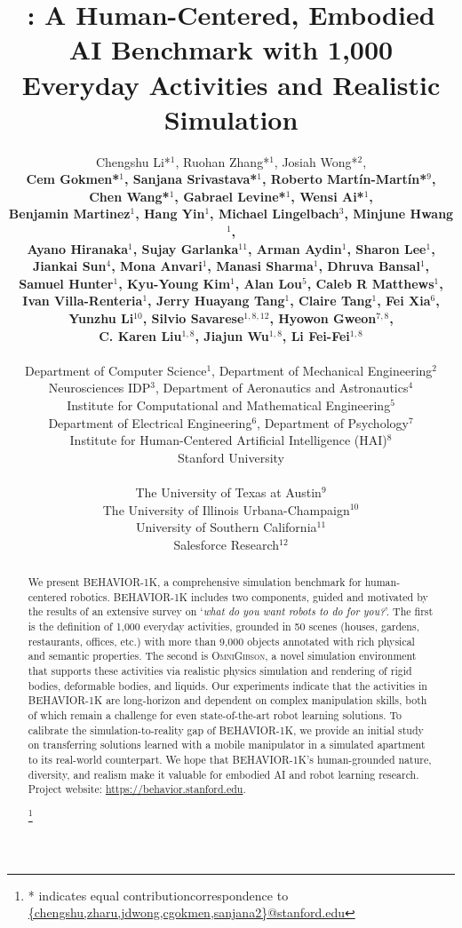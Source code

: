\documentclass{article}
\title{\benchmark: A Human-Centered, Embodied AI Benchmark with 1,000 Everyday Activities and Realistic Simulation}
\author{%
Chengshu Li*$^{\scriptscriptstyle 1}$,
Ruohan Zhang*$^{\scriptscriptstyle 1}$,
Josiah Wong*$^{\scriptscriptstyle 2}$,
\\\textbf{
Cem Gokmen*$^{\scriptscriptstyle 1}$,
Sanjana Srivastava*$^{\scriptscriptstyle 1}$,
Roberto Martín-Martín*$^{\scriptscriptstyle 9}$,
}
\\\textbf{
Chen Wang*$^{\scriptscriptstyle 1}$,
Gabrael Levine*$^{\scriptscriptstyle 1}$,
Wensi Ai*$^{\scriptscriptstyle 1}$,
}
\\\textbf{
Benjamin Martinez$^{\scriptscriptstyle 1}$,
Hang Yin$^{\scriptscriptstyle 1}$,
Michael Lingelbach$^{\scriptscriptstyle 3}$,
Minjune Hwang$^{\scriptscriptstyle 1}$,
}
\\\textbf{
Ayano Hiranaka$^{\scriptscriptstyle 1}$,
Sujay Garlanka$^{\scriptscriptstyle 11}$,
Arman Aydin$^{\scriptscriptstyle 1}$,
Sharon Lee$^{\scriptscriptstyle 1}$,
}
\\\textbf{
Jiankai Sun$^{\scriptscriptstyle 4}$, 
Mona Anvari$^{\scriptscriptstyle 1}$,
Manasi Sharma$^{\scriptscriptstyle 1}$,
Dhruva Bansal$^{\scriptscriptstyle 1}$,
}
\\\textbf{
Samuel Hunter$^{\scriptscriptstyle 1}$,
Kyu-Young Kim$^{\scriptscriptstyle 1}$,
Alan Lou$^{\scriptscriptstyle 5}$,
Caleb R Matthews$^{\scriptscriptstyle 1}$,
}
\\\textbf{
Ivan Villa-Renteria$^{\scriptscriptstyle 1}$, 
Jerry Huayang Tang$^{\scriptscriptstyle 1}$,
Claire Tang$^{\scriptscriptstyle 1}$,
Fei Xia$^{\scriptscriptstyle 6}$,
}
\\\textbf{
Yunzhu Li$^{\scriptscriptstyle 10}$,
Silvio Savarese$^{\scriptscriptstyle 1,8,12}$,
Hyowon Gweon$^{\scriptscriptstyle 7,8}$,
}
\\\textbf{
C. Karen Liu$^{\scriptscriptstyle 1,8}$, 
Jiajun Wu$^{\scriptscriptstyle 1,8}$, 
Li Fei-Fei$^{\scriptscriptstyle 1,8}$
}
\\\\
Department of Computer Science$^{\scriptscriptstyle 1}$, Department of Mechanical Engineering$^{\scriptscriptstyle 2}$
\\Neurosciences IDP$^{\scriptscriptstyle 3}$, Department of Aeronautics and Astronautics$^{\scriptscriptstyle 4}$
\\Institute for Computational and Mathematical Engineering$^{\scriptscriptstyle 5}$
\\Department of Electrical Engineering$^{\scriptscriptstyle 6}$, Department of Psychology$^{\scriptscriptstyle 7}$
\\Institute for Human-Centered Artificial Intelligence (HAI)$^{\scriptscriptstyle 8}$
\\Stanford University
\\
\\The University of Texas at Austin$^{\scriptscriptstyle 9}$ 
\\The University of Illinois Urbana-Champaign$^{\scriptscriptstyle 10}$
\\University of Southern California$^{\scriptscriptstyle 11}$
\\ Salesforce Research$^{\scriptscriptstyle 12}$
}
\newcommand\blfootnote[1]{%
  \begingroup
  \renewcommand\thefootnote{}\footnote{#1}%
  \addtocounter{footnote}{-1}%
  \endgroup
}
\newcommand{\benchmark}{BEHAVIOR-1K\xspace}
\newcommand{\dataset}{\textsc{BEHAVIOR-1K Dataset}\xspace}
\newcommand{\simulator}{\textsc{OmniGibson}\xspace}
\begin{document}
\maketitle


\begin{abstract}
We present \benchmark, a comprehensive simulation benchmark for human-centered robotics.
\benchmark includes two components, guided and motivated by the results of an extensive survey on `\textit{what do you want robots to do for you?}'. The first is the definition of 1,000 everyday activities, grounded in 50 scenes (houses, gardens, restaurants, offices, etc.) with more than 9,000 objects annotated with rich physical and semantic properties. %
The second is \simulator, a novel simulation environment that supports these activities via realistic physics simulation and rendering of rigid bodies, deformable bodies, and liquids. %
Our experiments indicate that the activities in \benchmark are long-horizon and dependent on complex manipulation skills, both of which remain a challenge for even state-of-the-art robot learning solutions. To calibrate the simulation-to-reality gap of \benchmark, we provide an initial study on transferring solutions learned with a mobile manipulator in a simulated apartment to its real-world counterpart. %
We hope that \benchmark's human-grounded nature, diversity, and realism make it valuable for embodied AI and robot learning research.
Project website: \url{https://behavior.stanford.edu}.

\blfootnote{* indicates equal contribution\newline correspondence to \href{mailto:chengshu@stanford.edu,zharu@stanford.edu,jdwong@stanford.edu,cgokmen@stanford.edu,sanjana2@stanford.edu}{\{chengshu,zharu,jdwong,cgokmen,sanjana2\}@stanford.edu} }

\end{abstract}
\end{document}
